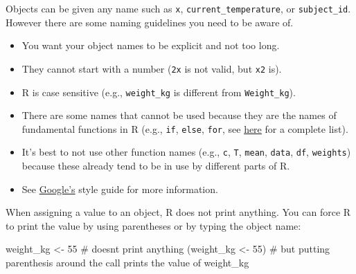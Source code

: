 \documentclass[
  letterpaper,
  DIV=11,
  numbers=noendperiod,
  oneside]{scrreprt}
\newenvironment{Shaded}{\begin{snugshade}}{\end{snugshade}}
\newcommand{\CommentTok}[1]{\textcolor[rgb]{0.37,0.37,0.37}{#1}}
\newcommand{\DecValTok}[1]{\textcolor[rgb]{0.68,0.00,0.00}{#1}}
\newcommand{\NormalTok}[1]{\textcolor[rgb]{0.00,0.23,0.31}{#1}}
\newcommand{\OtherTok}[1]{\textcolor[rgb]{0.00,0.23,0.31}{#1}}
\providecommand{\tightlist}{%
  \setlength{\itemsep}{0pt}\setlength{\parskip}{0pt}}\usepackage{longtable,booktabs,array}
\begin{document}
\begin{tcolorbox}[enhanced jigsaw, bottomrule=.15mm, colback=white, colframe=quarto-callout-note-color-frame, toprule=.15mm, coltitle=black, rightrule=.15mm, opacitybacktitle=0.6, colbacktitle=quarto-callout-note-color!10!white, toptitle=1mm, leftrule=.75mm, breakable, bottomtitle=1mm, titlerule=0mm, title=\textcolor{quarto-callout-note-color}{\faInfo}\hspace{0.5em}{Names are important}, arc=.35mm, left=2mm, opacityback=0]

Objects can be given any name such as \texttt{x},
\texttt{current\_temperature}, or \texttt{subject\_id}. However there
are some naming guidelines you need to be aware of.

\begin{itemize}
\tightlist
\item
  You want your object names to be explicit and not too long.
\item
  They cannot start with a number (\texttt{2x} is not valid, but
  \texttt{x2} is).
\item
  R is case sensitive (e.g., \texttt{weight\_kg} is different from
  \texttt{Weight\_kg}).
\item
  There are some names that cannot be used because they are the names of
  fundamental functions in R (e.g., \texttt{if}, \texttt{else},
  \texttt{for}, see
  \href{https://stat.ethz.ch/R-manual/R-devel/library/base/html/Reserved.html}{here}
  for a complete list).
\item
  It's best to not use other function names (e.g., \texttt{c},
  \texttt{T}, \texttt{mean}, \texttt{data}, \texttt{df},
  \texttt{weights}) because these already tend to be in use by different
  parts of R.
\item
  See \href{https://google.github.io/styleguide/Rguide.xml}{Google's}
  style guide for more information.
\end{itemize}

\end{tcolorbox}

When assigning a value to an object, R does not print anything. You can
force R to print the value by using parentheses or by typing the object
name:

\begin{Shaded}
\begin{Highlighting}[]
\NormalTok{weight\_kg }\OtherTok{\textless{}{-}} \DecValTok{55}    \CommentTok{\# doesn\textquotesingle{}t print anything}
\NormalTok{(weight\_kg }\OtherTok{\textless{}{-}} \DecValTok{55}\NormalTok{)  }\CommentTok{\# but putting parenthesis around the call prints the value of \textasciigrave{}weight\_kg\textasciigrave{}}
\end{Highlighting}
\end{Shaded}
\end{document}
